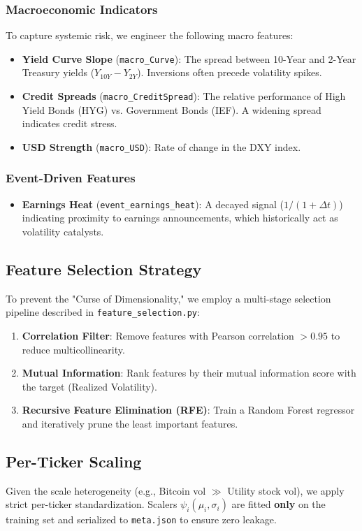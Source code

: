 \documentclass[11pt, a4paper]{article}
\begin{document}
\subsubsection{Macroeconomic Indicators}
To capture systemic risk, we engineer the following macro features:
\begin{itemize}
    \item \textbf{Yield Curve Slope} (\texttt{macro\_Curve}): The spread between 10-Year and 2-Year Treasury yields ($Y_{10Y} - Y_{2Y}$). Inversions often precede volatility spikes.
    \item \textbf{Credit Spreads} (\texttt{macro\_CreditSpread}): The relative performance of High Yield Bonds (HYG) vs. Government Bonds (IEF). A widening spread indicates credit stress.
    \item \textbf{USD Strength} (\texttt{macro\_USD}): Rate of change in the DXY index.
\end{itemize}

\subsubsection{Event-Driven Features}
\begin{itemize}
    \item \textbf{Earnings Heat} (\texttt{event\_earnings\_heat}): A decayed signal ($1/(1+\Delta t)$) indicating proximity to earnings announcements, which historically act as volatility catalysts.
\end{itemize}

\subsection{Feature Selection Strategy}
To prevent the "Curse of Dimensionality," we employ a multi-stage selection pipeline described in \texttt{feature\_selection.py}:
\begin{enumerate}
    \item \textbf{Correlation Filter}: Remove features with Pearson correlation $> 0.95$ to reduce multicollinearity.
    \item \textbf{Mutual Information}: Rank features by their mutual information score with the target (Realized Volatility).
    \item \textbf{Recursive Feature Elimination (RFE)}: Train a Random Forest regressor and iteratively prune the least important features.
\end{enumerate}

\subsection{Per-Ticker Scaling}
Given the scale heterogeneity (e.g., Bitcoin vol $\gg$ Utility stock vol), we apply strict per-ticker standardization. Scalers $\psi_i(\mu_i, \sigma_i)$ are fitted \textbf{only} on the training set and serialized to \texttt{meta.json} to ensure zero leakage.
\end{document}
